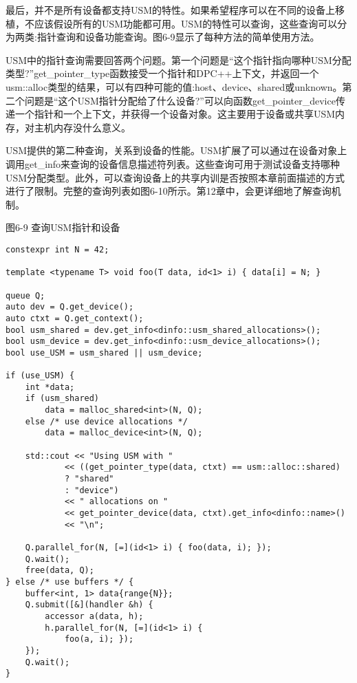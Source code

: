 最后，并不是所有设备都支持USM的特性。如果希望程序可以在不同的设备上移植，不应该假设所有的USM功能都可用。USM的特性可以查询，这些查询可以分为两类:指针查询和设备功能查询。图6-9显示了每种方法的简单使用方法。\par

USM中的指针查询需要回答两个问题。第一个问题是“这个指针指向哪种USM分配类型?”get\_pointer\_type函数接受一个指针和DPC++上下文，并返回一个usm::alloc类型的结果，可以有四种可能的值:host、device、shared或unknown。第二个问题是“这个USM指针分配给了什么设备?”可以向函数get\_pointer\_device传递一个指针和一个上下文，并获得一个设备对象。这主要用于设备或共享USM内存，对主机内存没什么意义。\par

USM提供的第二种查询，关系到设备的性能。USM扩展了可以通过在设备对象上调用get\_info来查询的设备信息描述符列表。这些查询可用于测试设备支持哪种USM分配类型。此外，可以查询设备上的共享内训是否按照本章前面描述的方式进行了限制。完整的查询列表如图6-10所示。第12章中，会更详细地了解查询机制。\par

\hspace*{\fill} \par %
图6-9 查询USM指针和设备
\begin{lstlisting}[caption={}]
constexpr int N = 42;

template <typename T> void foo(T data, id<1> i) { data[i] = N; }

queue Q;
auto dev = Q.get_device();
auto ctxt = Q.get_context();
bool usm_shared = dev.get_info<dinfo::usm_shared_allocations>();
bool usm_device = dev.get_info<dinfo::usm_device_allocations>();
bool use_USM = usm_shared || usm_device;

if (use_USM) {
	int *data;
	if (usm_shared)
		data = malloc_shared<int>(N, Q);
	else /* use device allocations */
		data = malloc_device<int>(N, Q);
		
	std::cout << "Using USM with "
			<< ((get_pointer_type(data, ctxt) == usm::alloc::shared)
			? "shared"
			: "device")
			<< " allocations on "
			<< get_pointer_device(data, ctxt).get_info<dinfo::name>()
			<< "\n";
			
	Q.parallel_for(N, [=](id<1> i) { foo(data, i); });
	Q.wait();
	free(data, Q);
} else /* use buffers */ {
	buffer<int, 1> data{range{N}};
	Q.submit([&](handler &h) {
		accessor a(data, h);
		h.parallel_for(N, [=](id<1> i) {
			foo(a, i); });
	});
	Q.wait();
}
\end{lstlisting}

